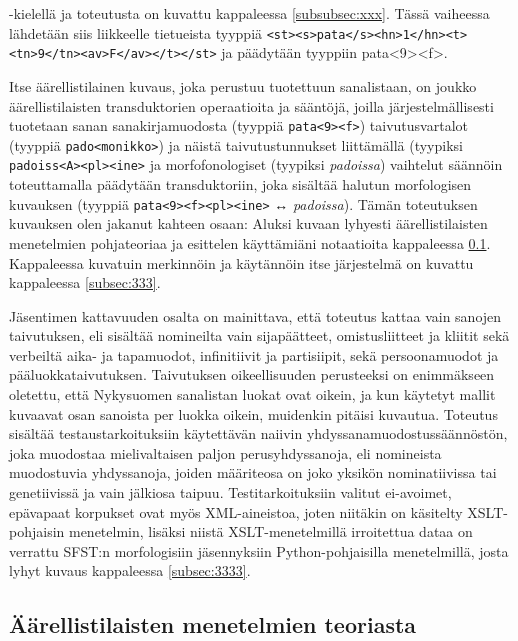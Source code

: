\documentclass[free]{flammie}
\begin{document}
-kielellä ja toteutusta on kuvattu kappaleessa \ref{subsubsec:xxx}. Tässä vaiheessa lähdetään siis liikkeelle tietueista tyyppiä
\texttt{<st><s>pata</s><hn>1</hn><t><tn>9</tn><av>F</av></t></st>}
ja päädytään tyyppiin pata<9><f>.

Itse äärellistilainen kuvaus, joka perustuu tuotettuun sanalistaan, on joukko
äärellistilaisten transduktorien operaatioita ja sääntöjä, joilla
järjestelmällisesti tuotetaan sanan sanakirjamuodosta (tyyppiä
\texttt{pata<9><f>}) taivutusvartalot
(tyyppiä \texttt{pado<monikko>}) ja näistä taivutustunnukset liittämällä (tyypiksi
\texttt{padoiss<A><pl><ine>} ja morfofonologiset (tyypiksi \textit{padoissa}) vaihtelut
säännöin toteuttamalla päädytään transduktoriin, joka sisältää halutun morfologisen kuvauksen (tyyppiä
\texttt{pata<9><f><pl><ine>} ↔ \textit{padoissa}). Tämän
toteutuksen kuvauksen olen jakanut kahteen osaan: Aluksi kuvaan lyhyesti
äärellistilaisten menetelmien pohjateoriaa ja esittelen käyttämiäni notaatioita
kappaleessa \ref{subsec:fsa}. Kappaleessa kuvatuin merkinnöin ja käytännöin itse järjestelmä on
kuvattu kappaleessa \ref{subsec:333}.

Jäsentimen kattavuuden osalta on mainittava, että toteutus kattaa vain sanojen taivutuksen, eli sisältää nomineilta vain sijapäätteet, omistusliitteet ja kliitit sekä verbeiltä aika- ja tapamuodot, infinitiivit ja partisiipit, sekä persoonamuodot ja pääluokkataivutuksen. Taivutuksen oikeellisuuden perusteeksi on enimmäkseen oletettu, että Nykysuomen sanalistan luokat ovat oikein, ja kun käytetyt mallit kuvaavat osan sanoista per luokka oikein, muidenkin pitäisi kuvautua. Toteutus sisältää testaustarkoituksiin käytettävän naiivin yhdyssanamuodostussäännöstön, joka
muodostaa mielivaltaisen paljon perusyhdyssanoja, eli nomineista muodostuvia
yhdyssanoja, joiden määriteosa on joko yksikön nominatiivissa tai genetiivissä ja
vain jälkiosa taipuu.
Testitarkoituksiin valitut ei-avoimet, epävapaat korpukset ovat myös XML-aineistoa, joten niitäkin on käsitelty XSLT-pohjaisin menetelmin, lisäksi niistä
XSLT-menetelmillä irroitettua dataa on verrattu SFST:n morfologisiin
jäsennyksiin Python-pohjaisilla menetelmillä, josta lyhyt kuvaus kappaleessa
\ref{subsec:3333}.



\subsection{Äärellistilaisten menetelmien teoriasta} \label{subsec:fsa}
\end{document}
